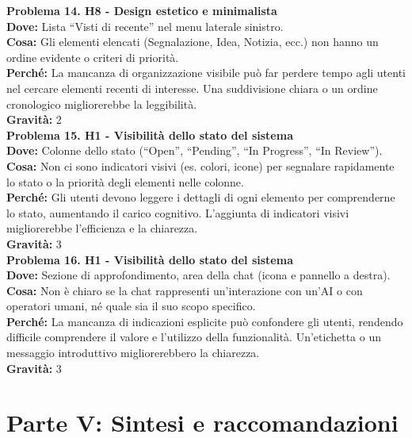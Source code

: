 \documentclass[a4paper,12pt]{article}
\begin{document}
\textbf{Problema 14. H8 - Design estetico e minimalista} \\
\textbf{Dove:} Lista “Visti di recente” nel menu laterale sinistro. \\
\textbf{Cosa:} Gli elementi elencati (Segnalazione, Idea, Notizia, ecc.) non hanno un ordine evidente o criteri di priorità. \\
\textbf{Perché:} La mancanza di organizzazione visibile può far perdere tempo agli utenti nel cercare elementi recenti di interesse. Una suddivisione chiara o un ordine cronologico migliorerebbe la leggibilità. \\
\textbf{Gravità:} 2 \\[1em]

\textbf{Problema 15. H1 - Visibilità dello stato del sistema} \\
\textbf{Dove:} Colonne dello stato (“Open”, “Pending”, “In Progress”, “In Review”). \\
\textbf{Cosa:} Non ci sono indicatori visivi (es. colori, icone) per segnalare rapidamente lo stato o la priorità degli elementi nelle colonne. \\
\textbf{Perché:} Gli utenti devono leggere i dettagli di ogni elemento per comprenderne lo stato, aumentando il carico cognitivo. L’aggiunta di indicatori visivi migliorerebbe l’efficienza e la chiarezza. \\
\textbf{Gravità:} 3 \\[1em]

\textbf{Problema 16. H1 - Visibilità dello stato del sistema} \\
\textbf{Dove:} Sezione di approfondimento, area della chat (icona e pannello a destra). \\
\textbf{Cosa:} Non è chiaro se la chat rappresenti un’interazione con un’AI o con operatori umani, né quale sia il suo scopo specifico. \\
\textbf{Perché:} La mancanza di indicazioni esplicite può confondere gli utenti, rendendo difficile comprendere il valore e l’utilizzo della funzionalità. Un’etichetta o un messaggio introduttivo migliorerebbero la chiarezza. \\
\textbf{Gravità:} 3 \\[1em]

\section*{Parte V: Sintesi e raccomandazioni}
\end{document}
